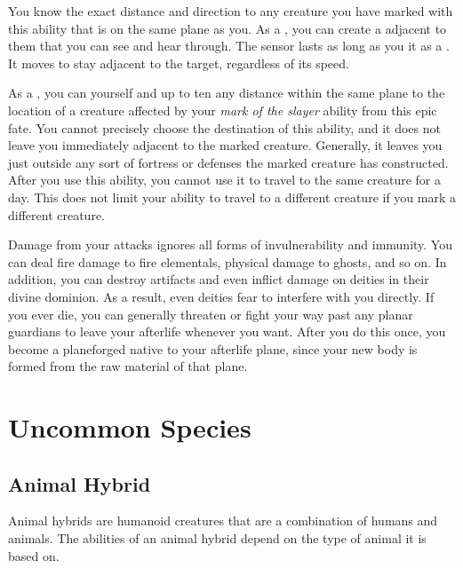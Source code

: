             You know the exact distance and direction to any creature you have marked with this ability that is on the same plane as you.
            As a , you can create a  adjacent to them that you can see and hear through.
            The sensor lasts as long as you  it as a .
            It moves to stay adjacent to the target, regardless of its speed.

             As a , you can  yourself and up to ten  any distance within the same plane to the location of a creature affected by your \textit{mark of the slayer} ability from this epic fate.
            You cannot precisely choose the destination of this ability, and it does not leave you immediately adjacent to the marked creature.
            Generally, it leaves you just outside any sort of fortress or defenses the marked creature has constructed.
            After you use this ability, you cannot use it to travel to the same creature for a day.
            This does not limit your ability to travel to a different creature if you mark a different creature.

            Damage from your attacks ignores all forms of invulnerability and immunity.
            You can deal fire damage to fire elementals, physical damage to ghosts, and so on.
            In addition, you can destroy artifacts and even inflict damage on deities in their divine dominion.
            As a result, even deities fear to interfere with you directly.
            If you ever die, you can generally threaten or fight your way past any planar guardians to leave your afterlife whenever you want.
            After you do this once, you become a planeforged native to your afterlife plane, since your new body is formed from the raw material of that plane.

\section{Uncommon Species}\label{Uncommon Species}

    \subsection{Animal Hybrid}
        Animal hybrids are humanoid creatures that are a combination of humans and animals.
        The abilities of an animal hybrid depend on the type of animal it is based on.


